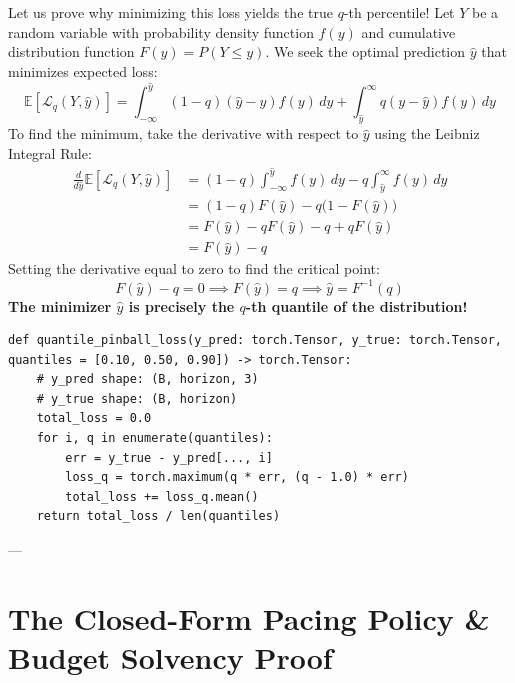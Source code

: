 \documentclass[11pt,a4paper]{article}
\begin{document}
\begin{mathcheck}
Let us prove why minimizing this loss yields the true $q$-th percentile!
Let $Y$ be a random variable with probability density function $f(y)$ and cumulative distribution function $F(y) = P(Y \le y)$.
We seek the optimal prediction $\hat{y}$ that minimizes expected loss:
\begin{equation}
    \mathbb{E}[\mathcal{L}_q(Y, \hat{y})] = \int_{-\infty}^{\hat{y}} (1 - q)(\hat{y} - y) f(y) \, dy + \int_{\hat{y}}^{\infty} q(y - \hat{y}) f(y) \, dy
\end{equation}
To find the minimum, take the derivative with respect to $\hat{y}$ using the Leibniz Integral Rule:
\begin{align}
    \frac{d}{d\hat{y}}\mathbb{E}[\mathcal{L}_q(Y, \hat{y})] &= (1 - q)\int_{-\infty}^{\hat{y}} f(y) \, dy - q \int_{\hat{y}}^{\infty} f(y) \, dy \\
    &= (1 - q) F(\hat{y}) - q \big(1 - F(\hat{y})\big) \\
    &= F(\hat{y}) - q F(\hat{y}) - q + q F(\hat{y}) \\
    &= F(\hat{y}) - q
\end{align}
Setting the derivative equal to zero to find the critical point:
\begin{equation}
    F(\hat{y}) - q = 0 \implies F(\hat{y}) = q \implies \hat{y} = F^{-1}(q)
\end{equation}
\textbf{The minimizer $\hat{y}$ is precisely the $q$-th quantile of the distribution!}
\end{mathcheck}

\begin{codebox}
\begin{lstlisting}
def quantile_pinball_loss(y_pred: torch.Tensor, y_true: torch.Tensor, quantiles = [0.10, 0.50, 0.90]) -> torch.Tensor:
    # y_pred shape: (B, horizon, 3)
    # y_true shape: (B, horizon)
    total_loss = 0.0
    for i, q in enumerate(quantiles):
        err = y_true - y_pred[..., i]
        loss_q = torch.maximum(q * err, (q - 1.0) * err)
        total_loss += loss_q.mean()
    return total_loss / len(quantiles)
\end{lstlisting}
\end{codebox}

---

\section{The Closed-Form Pacing Policy \& Budget Solvency Proof}
\end{document}
